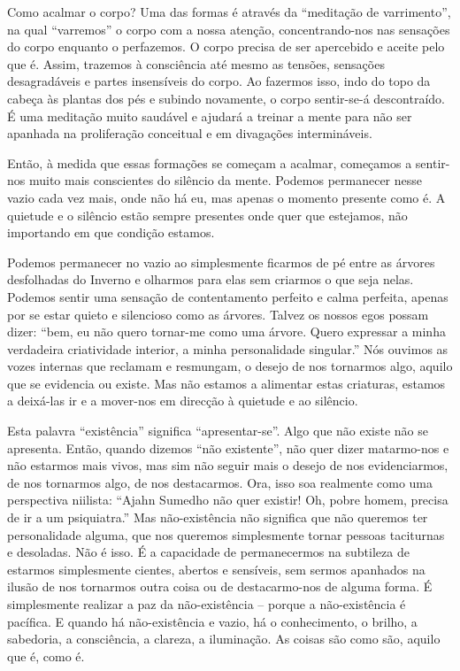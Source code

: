 Como acalmar o corpo? Uma das formas é através da ``meditação de varrimento'', na
qual ``varremos'' o corpo com a nossa atenção, concentrando-nos nas sensações do
corpo enquanto o perfazemos. O corpo precisa de ser apercebido e aceite pelo que
é. Assim, trazemos à consciência até mesmo as tensões, sensações desagradáveis e
partes insensíveis do corpo. Ao fazermos isso, indo do topo da cabeça às plantas
dos pés e subindo novamente, o corpo sentir-se-á descontraído. É uma meditação
muito saudável e ajudará a treinar a mente para não ser apanhada na proliferação
conceitual e em divagações intermináveis.

Então, à medida que essas formações se começam a acalmar, começamos a sentir-nos
muito mais conscientes do silêncio da mente. Podemos permanecer nesse vazio cada
vez mais, onde não há eu, mas apenas o momento presente como é. A quietude e o
silêncio estão sempre presentes onde quer que estejamos, não importando em que
condição estamos.

Podemos permanecer no vazio ao simplesmente ficarmos de pé entre as árvores
desfolhadas do Inverno e olharmos para elas sem criarmos o que seja nelas.
Podemos sentir uma sensação de contentamento perfeito e calma perfeita, apenas
por se estar quieto e silencioso como as árvores. Talvez os nossos egos possam
dizer: ``bem, eu não quero tornar-me como uma árvore. Quero expressar a minha
verdadeira criatividade interior, a minha personalidade singular.'' Nós ouvimos
as vozes internas que reclamam e resmungam, o desejo de nos tornarmos algo,
aquilo que se evidencia ou existe. Mas não estamos a alimentar estas criaturas,
estamos a deixá-las ir e a mover-nos em direcção à quietude e ao silêncio.

Esta palavra ``existência'' significa ``apresentar-se''. Algo que não existe não
se apresenta. Então, quando dizemos ``não existente'', não quer dizer
matarmo-nos e não estarmos mais vivos, mas sim não seguir mais o desejo de nos
evidenciarmos, de nos tornarmos algo, de nos destacarmos. Ora, isso soa
realmente como uma perspectiva niilista: ``Ajahn Sumedho não quer existir! Oh,
pobre homem, precisa de ir a um psiquiatra.'' Mas não-existência não significa
que não queremos ter personalidade alguma, que nos queremos simplesmente tornar
pessoas taciturnas e desoladas. Não é isso. É a capacidade de permanecermos na
subtileza de estarmos simplesmente cientes, abertos e sensíveis, sem sermos
apanhados na ilusão de nos tornarmos outra coisa ou de destacarmo-nos de alguma
forma. É simplesmente realizar a paz da não-existência -- porque a
não-existência é pacífica. E quando há não-existência e vazio, há o
conhecimento, o brilho, a sabedoria, a consciência, a clareza, a iluminação. As
coisas são como são, aquilo que é, como é.

